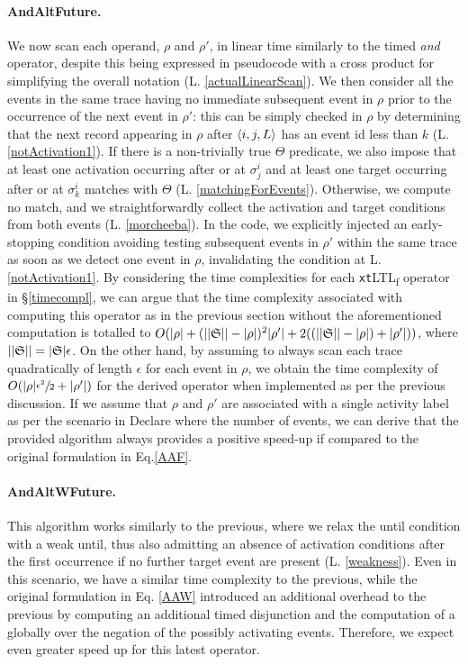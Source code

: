 \documentclass[sigconf]{acmart}
\begin{document}
\paragraph{AndAltFuture.} We now scan each operand, $\rho$ and $\rho'$, in linear time similarly to the timed \textit{and} operator, despite this being expressed in pseudocode with a cross product for simplifying the overall notation (L. \ref{actualLinearScan}). We then consider all the events in the same trace having no immediate subsequent event in $\rho$ prior to the occurrence of the next event in $\rho'$: this can be simply checked in $\rho$ by determining that the next record appearing in $\rho$ after $\braket{i,j,L}$ has an event id less than $k$ (L. \ref{notActivation1}). If there is a non-trivially true $\Theta$ predicate, we also impose that at least one activation occurring after or at $\sigma^i_j$ and at least one target occurring after or at $\sigma^i_k$ matches with $\Theta$ (L. \ref{matchingForEvents}). Otherwise, we compute no match, and we straightforwardly collect the activation and target conditions from both events (L. \ref{morcheeba}). In the code, we explicitly injected an early-stopping condition avoiding testing subsequent events in $\rho'$ within the same trace as soon as we detect one event in $\rho$, invalidating the condition at L. \ref{notActivation1}. By considering the time complexities for each \texttt{xt}LTL\textsubscript{f} operator in \S\ref{timecompl}, we can argue that the time complexity associated with computing this operator as in the previous section without the aforementioned computation is totalled to $O(|\rho|+(||\mathfrak{S}||-|\rho|)^2|\rho'|+2((||\mathfrak{S}||-|\rho|)+|\rho'|))$, where $||\mathfrak{S}||=|\mathfrak{S}|\epsilon$. On the other hand, by assuming to always scan each trace quadratically of length $\epsilon$ for each event in $\rho$, we obtain the time complexity of $O(|\rho|\sfrac{\epsilon^2}{2}+|\rho'|)$ for the derived operator when implemented as per the previous discussion. If we assume that $\rho$ and $\rho'$ are associated with a single activity label as per the scenario in Declare where the number of events, we can derive that the provided algorithm always provides a positive speed-up if compared to the original formulation in Eq.\ref{AAF}. \medskip

\paragraph{AndAltWFuture.} This algorithm works similarly to the previous, where we relax the until condition with a weak until, thus also admitting an absence of activation conditions after the first occurrence if no further target event are present (L. \ref{weakness}). Even in this scenario, we have a similar time complexity to the previous, while the original formulation in Eq. \ref{AAW} introduced an additional overhead to the previous by computing an additional timed disjunction and the computation of a globally over the negation of the possibly activating events. Therefore, we expect even greater speed up for this latest operator.   \medskip
\end{document}
